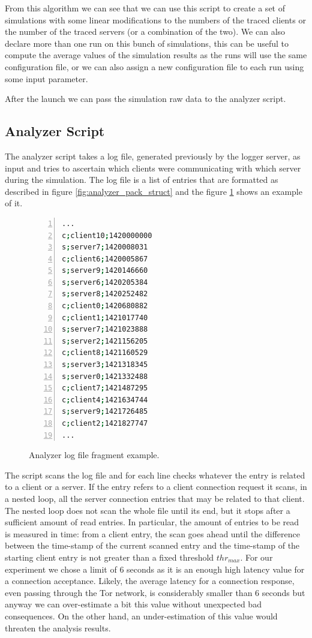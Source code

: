 From this algorithm we can see that we can use this script to create a set of
simulations with some linear modifications to the numbers of the traced clients
or the number of the traced servers (or a combination of the two).
We can also declare more than one run on this bunch of simulations, this can
be useful to compute the average values of the simulation results as the runs
will use the same configuration file, or we
can also assign a new configuration file to each run using some input parameter.

After the launch we can pass the simulation raw data to the analyzer script.

\subsection{Analyzer Script}
The analyzer script takes a log file, generated previously by the logger
server, as input and tries to
ascertain which clients were communicating with which server during the
simulation. The log file is a list of entries that are formatted as described in
 figure \ref{fig:analyzer_pack_struct} and the figure
\ref{fig:example_log_file} shows an example of it.
\begin{figure}[H]
\centering
\begin{lstlisting}[language=bash,frame=single, numbers=left]
...
c;client10;1420000000
s;server7;1420008031
c;client6;1420005867
s;server9;1420146660
s;server6;1420205384
s;server8;1420252482
c;client0;1420680882
c;client1;1421017740
s;server7;1421023888
s;server2;1421156205
c;client8;1421160529
s;server3;1421318345
s;server0;1421332488
c;client7;1421487295
c;client4;1421634744
s;server9;1421726485
c;client2;1421827747
...
\end{lstlisting}
\caption{Analyzer log file fragment example.}
\label{fig:example_log_file}
\end{figure}
The script scans the log file and for each line checks whatever the entry is
related to a client or a server. If the entry refers to a client
connection request it scans, in a nested loop, all the server connection entries
that may be related to that client. The nested loop does not scan the whole
file until its end, but it stops after a sufficient amount of
read entries. In particular, the amount of entries to be read is
measured in time: from a client entry, the scan goes
ahead until the difference between the time-stamp of the current scanned 
entry and the time-stamp of the starting client entry is not greater
than a fixed threshold $thr_{max}$. For our experiment we chose a limit of 6
seconds as it is an enough high latency
value for a connection acceptance. Likely, the average latency for a
connection response, even passing through the Tor network, is
considerably smaller than 6 seconds but anyway we can over-estimate a bit this
value without unexpected bad consequences. On the other hand, an
under-estimation of
this value would threaten the analysis results. 

